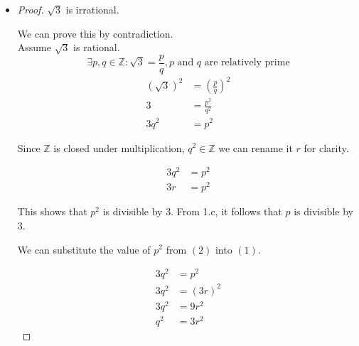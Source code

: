 \documentclass[12pt,letterpaper]{article}
\begin{document}
\begin{enumerate}
\begin{enumerate}
            \begin{itemize}

                \item
                    \begin{proof}
                        $\sqrt{3}$ is irrational.

                        We can prove this by contradiction. \\

                        Assume $\sqrt{3}$ is rational.
                        \[
                            \exists p, q \in \mathbb{Z} :
                            \sqrt{3} = \frac{p}{q},
                            p \text{ and } q \text{ are relatively prime}
                        \]
                        \begin{align*}
                            \left(\sqrt{3}\right)^2 &=
                                \left(\frac{p}{q}\right)^2 \\
                            3 &= \frac{p^2}{q^2} \\
                            3q^2 &= p^2 \tag{1}
                        \end{align*}

                        Since $\mathbb{Z}$ is closed under multiplication,
                        $q^2 \in \mathbb{Z}$ we can rename it $r$ for clarity.

                        \begin{align*}
                            3q^2 &= p^2 \\
                            3r &= p^2 \tag{2}
                        \end{align*}

                        This shows that $p^2$ is divisible by $3$.
                        From 1.c, it follows that $p$ is divisible by $3$.

                        We can substitute the value of $p^2$
                        from $(2)$ into $(1)$.

                        \begin{align*}
                            3q^2 &= p^2 \\
                            3q^2 &= \left(3r\right)^2 \\
                            3q^2 &= 9r^2 \\
                            q^2 &= 3r^2
                        \end{align*}


\end{proof}
\end{itemize}
\end{enumerate}
\end{enumerate}
\end{document}
